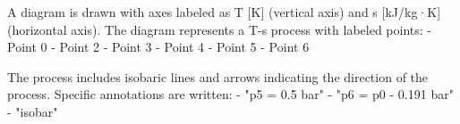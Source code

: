 A diagram is drawn with axes labeled as T [K] (vertical axis) and s [kJ/kg·K] (horizontal axis). The diagram represents a T-s process with labeled points:  
- Point 0  
- Point 2  
- Point 3  
- Point 4  
- Point 5  
- Point 6  

The process includes isobaric lines and arrows indicating the direction of the process. Specific annotations are written:  
- "p5 = 0.5 bar"  
- "p6 = p0 - 0.191 bar"  
- "isobar"